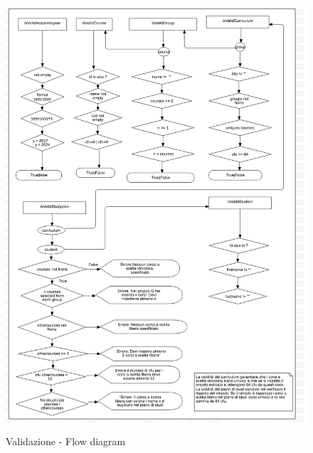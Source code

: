 \documentclass{article}
\begin{document}
\begin{figure}[H]
  \begin{center}
   \includegraphics[width=\textwidth]{img/validazione.png}
     \caption{Validazione - Flow diagram}
  \label{fig:ValidationFlowDiagram}
  \end{center}
\end{figure}

\newpage
\end{document}
